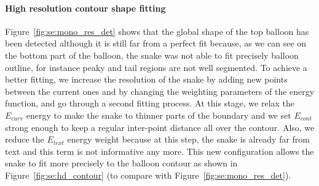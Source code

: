 

\paragraph{High resolution contour shape fitting}
Figure~\ref{fig:se:mono_res_det} shows that the global shape of the top balloon has been detected although it is still far from a perfect fit because, as we can see on the bottom part of the balloon, the snake was not able to fit precisely balloon outline, for instance peaky and tail regions are not well segmented.
To achieve a better fitting, we increase the resolution of the snake by adding new points between the current ones and by changing the weighting parameters of the energy function, and go through a second fitting process.
At this stage, we relax the $E_{curv}$ energy to make the snake to thinner parts of the boundary and we set $E_{cont}$ strong enough to keep a regular inter-point distance all over the contour.
Also, we reduce the $E_{text}$ energy weight because at this step, the snake is already far from text and this term is not informative any more.
This new configuration allows the snake to fit more precisely to the balloon contour as shown in Figure~\ref{fig:se:hd_contour} (to compare with Figure~\ref{fig:se:mono_res_det}).

